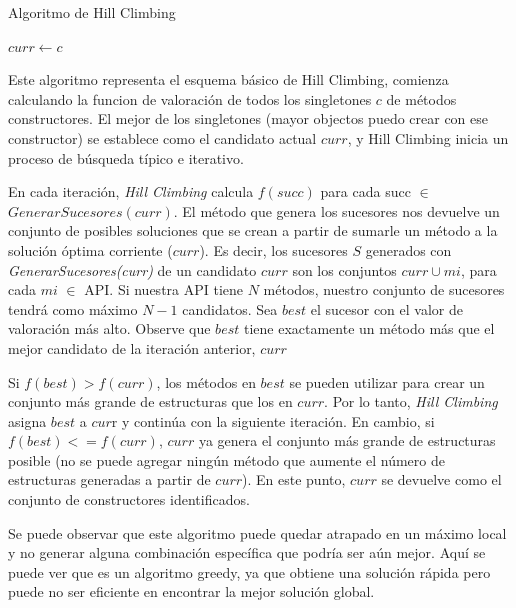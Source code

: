 \begin{algorithm}[H]
  \caption{Algoritmo de Hill Climbing}
  \label{algo:hill_climbing}
  \SetAlgoLined
  $curr \gets c$\; 
  
  \;
\end{algorithm}

Este algoritmo representa el esquema básico de Hill Climbing, comienza calculando la funcion de valoración de todos los singletones ${c}$ de métodos constructores.  El mejor de los singletones (mayor objectos puedo crear con ese constructor) se establece como el candidato actual $curr$, y Hill Climbing inicia un proceso de búsqueda típico e iterativo.

En cada iteración, \emph{Hill Climbing} calcula $f(succ)$ para cada succ $\in$ $GenerarSucesores(curr)$. El método que genera los sucesores nos devuelve un conjunto de posibles soluciones que se crean a partir de sumarle un método a la solución óptima corriente ($curr$). Es decir, los sucesores  $S$ generados con \emph{GenerarSucesores(curr)} de un candidato $curr$ son los conjuntos {$curr\cup{mi}$}, para cada $mi$ $\in$ API. Si nuestra API tiene $N$ métodos, nuestro conjunto de sucesores tendrá como máximo $N-1$ candidatos.
Sea $best$ el sucesor con el valor de valoración más alto. Observe que $best$ tiene exactamente un método más que el mejor candidato de la iteración anterior, $curr$

Si $f(best) > f(curr)$, los métodos en $best$ se pueden utilizar para crear un conjunto más grande de estructuras que los en $curr$. Por lo tanto, \emph{Hill Climbing} asigna $best$ a $cur$r y continúa con la siguiente iteración. En cambio, si $f(best) <= f(curr)$, $curr$ ya genera el conjunto más grande de estructuras posible (no se puede agregar ningún método que aumente el número de estructuras generadas a partir de $curr$). En este punto, $curr$ se devuelve como el conjunto de constructores identificados.

Se puede observar que este algoritmo puede quedar atrapado en un máximo local y no generar alguna combinación específica que podría ser aún mejor. Aquí se puede ver que es un algoritmo greedy, ya que obtiene una solución rápida pero puede no ser eficiente en encontrar la mejor solución global. 


